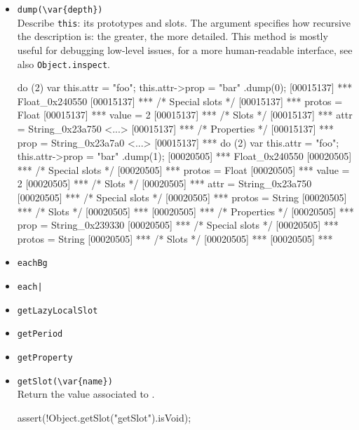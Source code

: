\begin{itemize}
\item \lstinline|dump(\var{depth})|\\
  Describe \lstinline|this|: its prototypes and slots.  The argument
   specifies how recursive the description is: the greater,
  the more detailed.  This method is mostly useful for debugging
  low-level issues, for a more human-readable interface, see also
  \lstinline|Object.inspect|.
\begin{urbiscript}[firstnumber=last]
do (2) { var this.attr = "foo"; this.attr->prop = "bar" }.dump(0);
[00015137] *** Float_0x240550 {
[00015137] ***   /* Special slots */
[00015137] ***   protos = Float
[00015137] ***   value = 2
[00015137] ***   /* Slots */
[00015137] ***   attr = String_0x23a750 <...>
[00015137] ***     /* Properties */
[00015137] ***     prop = String_0x23a7a0 <...>
[00015137] ***   }
do (2) { var this.attr = "foo"; this.attr->prop = "bar" }.dump(1);
[00020505] *** Float_0x240550 {
[00020505] ***   /* Special slots */
[00020505] ***   protos = Float
[00020505] ***   value = 2
[00020505] ***   /* Slots */
[00020505] ***   attr = String_0x23a750 {
[00020505] ***     /* Special slots */
[00020505] ***     protos = String
[00020505] ***     /* Slots */
[00020505] ***     }
[00020505] ***     /* Properties */
[00020505] ***     prop = String_0x239330 {
[00020505] ***       /* Special slots */
[00020505] ***       protos = String
[00020505] ***       /* Slots */
[00020505] ***       }
[00020505] ***   }
\end{urbiscript}

\item \lstinline|eachBg|\\

\item \lstinline$each|$\\

\item \lstinline|getLazyLocalSlot|\\

\item \lstinline|getPeriod|\\

\item \lstinline|getProperty|\\

\item \lstinline|getSlot(\var{name})|\\
  Return the value associated to .

\begin{urbiscript}[firstnumber=last]
assert(!Object.getSlot("getSlot").isVoid);
\end{urbiscript}


\end{itemize}
